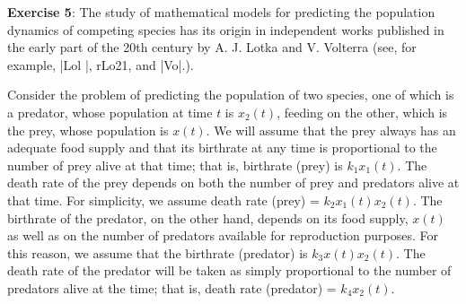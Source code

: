\documentclass{article}
\begin{document}
\textbf{Exercise 5}: The study of mathematical models for predicting the population dynamics of competing species has its origin in independent works published in the early part of the 20th century by A. J. Lotka and V. Volterra (see, for example, |Lol |, rLo21, and |Vo|.).

Consider the problem of predicting the population of two species, one of which is a predator, whose population at time $t$ is $x_{2}(t)$, feeding on the other, which is the prey, whose population is $x(t)$. We will assume that the prey always has an adequate food supply and that its birthrate at any time is proportional to the number of prey alive at that time; that is, birthrate (prey) is $k_{1}x_{1}(t)$. The death rate of the prey depends on both the number of prey and predators alive at that time. For simplicity, we assume death rate (prey) = $k_{2}x_{1}(t)x_{2}(t)$. The birthrate of the predator, on the other hand, depends on its food supply, $x(t)$ as well as on the number of predators available for reproduction purposes. For this reason, we assume that the birthrate (predator) is $k_{3}x(t)x_{2}(t)$. The death rate of the predator will be taken as simply proportional to the number of predators alive at the time; that is, death rate (predator) = $k_{4}x_{2}(t)$.
\end{document}
